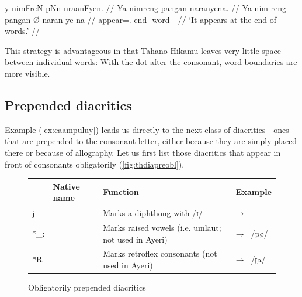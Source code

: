 \ex[everygla=\Tagati\Large,everyglb=\itshape]\begingl
	\gla y nimFreN\thafterdot{} pNn\thafterdot{} 
		nraanFyen. //
	\glb Ya nimreng pangan narānyena. //
	\glc Ya nim-reng pangan-Ø narān-ye-na //
	\glc \LocT{} appear=\TsgI{}.\Aarg{} end-\Top{} word-\Pl{}-\Gen{} //
	\glft `It appears at the end of words.' //
\endgl\xe

This strategy is advantageous in that Tahano Hikamu leaves very little space 
between individual words:  With the dot after the consonant, word boundaries are more visible.

\subsection{Prepended diacritics}

Example (\ref{ex:caampuluy}) leads us directly to the next class of 
diacritics---ones that are prepended to the consonant letter, either because 
they are simply placed there or because of allography. Let us first list those 
diacritics that appear in front of consonants obligatorily 
(\autoref{fig:thdiapreobl}).

\begin{figure}[htp]
\caption{Obligatorily prepended diacritics}
\begin{tabu} to 
\toprule
\tableheaderfont

	& Native name
	& Function
	& Example
	\\
	
\toprule

*j
	& 
	& Marks a diphthong with /ɪ/
	&  → 
	\\
	
\midrule

*\_:
	& 
	& Marks raised vowels (i.e. umlaut; not used in Ayeri)
	&  → ~/pø/
	\\
	
\midrule

*R
	& 
	& Marks retroflex consonants (not used in Ayeri)\footnotemark
	&  → ~/ʈa/
	\\

\bottomrule
\end{tabu}
\label{fig:thdiapreobl}
\end{figure}

